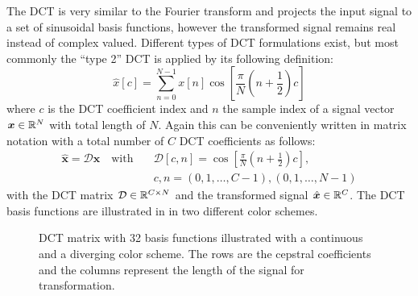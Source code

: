 The DCT is very similar to the Fourier transform and projects the input signal to a set of sinusoidal basis functions, however the transformed signal remains real instead of complex valued.
Different types of DCT formulations exist, but most commonly the \enquote{type 2} DCT is applied by its following definition:
\begin{equation}\label{eq:signal_mfcc_dct}
  \hat{x}[c] = \sum_{n=0}^{N-1} x[n] \cos{\left[ \frac{\pi}{N} \left( n + \frac{1}{2} \right) c \right]}
\end{equation}
where $c$ is the DCT coefficient index and $n$ the sample index of a signal vector $\bm{x} \in \mathbb{R}^N$ with total length of $N$.
Again this can be conveniently written in matrix notation with a total number of $C$ DCT coefficients as follows:
\begin{equation}\label{eq:signal_mfcc_dct_matrix}
  \begin{aligned}
    \hat{\bm{x}} = \mathcal{D} \bm{x} \quad \mathrm{with} 
    \quad &\mathcal{D}[c, n] = \cos{\left[ \frac{\pi}{N} \left( n + \frac{1}{2} \right) c  \right]},\\
    &c, n = (0, 1, \dots, C - 1), (0, 1, \dots, N - 1) 
  \end{aligned}
\end{equation}
with the DCT matrix $\mathcal{D} \in \mathbb{R}^{C \times N}$ and the transformed signal $\hat{\bm{x}} \in \mathbb{R}^C$.
The DCT basis functions are illustrated in  in two different color schemes.
\begin{figure}[!ht]
  \centering
  \qquad
  \caption{DCT matrix with 32 basis functions illustrated with a continuous and a diverging color scheme. The rows are the cepstral coefficients and the columns represent the length of the signal for transformation.}
  \label{fig:signal_mfcc_dct}
\end{figure}

